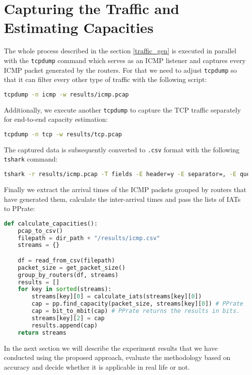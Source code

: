 \section{Capturing the Traffic and Estimating Capacities}

The whole process described in the section \ref{traffic_gen} is executed in parallel with the \texttt{tcpdump} command which serves as an ICMP listener and captures every ICMP packet generated by the routers. For that we need to adjust \texttt{tcpdump} so that it can filter every other type of traffic with the following script:

\begin{lstlisting}[language=bash]
tcpdump -n icmp -w results/icmp.pcap
\end{lstlisting}

Additionally, we execute another \texttt{tcpdump} to capture the TCP traffic separately for end-to-end capacity estimation:

\begin{lstlisting}[language=bash]
tcpdump -n tcp -w results/tcp.pcap
\end{lstlisting}

The captured data is subsequently converted to \texttt{.csv} format with the following \texttt{tshark} command:

\begin{lstlisting}[language=bash, breaklines=true]
tshark -r results/icmp.pcap -T fields -E header=y -E separator=, -E quote=d -E occurrence=f -e frame.time_epoch -e ip.src -e ip.dst -e ip.len > results/icmp.csv 
\end{lstlisting}

Finally we extract the arrival times of the ICMP packets grouped by routers that have generated them, calculate the inter-arrival times and pass the lists of IATs to PPrate:

\begin{lstlisting}[caption={Calculating capacities hop-by-hop with PPrate\cite{Brzoza}}, language=Python]
def calculate_capacities():
    pcap_to_csv()
    filepath = dir_path + "/results/icmp.csv"
    streams = {}

    df = read_from_csv(filepath)
    packet_size = get_packet_size()
    group_by_routers(df, streams)
    results = []
    for key in sorted(streams):
        streams[key][0] = calculate_iats(streams[key][0])
        cap = pp.find_capacity(packet_size, streams[key][0]) # PPrate 
        cap = bit_to_mbit(cap) # PPrate returns the results in bits. 
        streams[key][2] = cap
        results.append(cap)
    return streams

\end{lstlisting}

In the next section we will describe the experiment results that we have conducted using the proposed approach, evaluate the methodology based on accuracy and decide whether it is applicable in real life or not.
